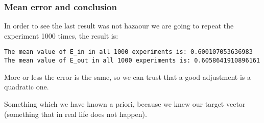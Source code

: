 \subsubsection{Mean error and conclusion}


In order to see the last result was not hazaour we are going to repeat the experiment 1000 times, the result is:


\begin{verbatim}
The mean value of E_in in all 1000 experiments is: 0.600107053636983
The mean value of E_out in all 1000 experiments is: 0.6058641910896161
\end{verbatim}

More or less the error is the same, so we can trust that a good adjustment is a quadratic one.

Something which we have known a priori, because we knew our target vector (something that in real life does not happen).

